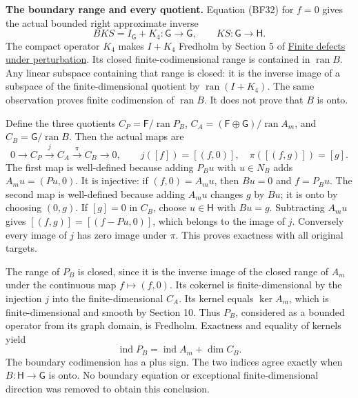 \documentclass[
  11pt,
]{article}
\begin{document}
\textbf{The boundary range and every quotient.} Equation (BF32) for
\(f=0\) gives the actual bounded right approximate inverse \[
 BK S=I_{\mathsf G}+K_4:\mathsf G\longrightarrow\mathsf G,
 \qquad KS:\mathsf G\longrightarrow\mathsf H.
 \tag{BF50}
\] The compact operator \(K_4\) makes \(I+K_4\) Fredholm by Section 5 of
\href{fredholm-stability.pdf}{Finite defects under perturbation}. Its
closed finite-codimensional range is contained in
\(\operatorname{ran}B\). Any linear subspace containing that range is
closed: it is the inverse image of a subspace of the finite-dimensional
quotient by \(\operatorname{ran}(I+K_4)\). The same observation proves
finite codimension of \(\operatorname{ran}B\). It does not prove that
\(B\) is onto.

Define the three quotients \(C_P=\mathsf F/\operatorname{ran}P_B\),
\(C_A=(\mathsf F\oplus\mathsf G)/\operatorname{ran}A_m\), and
\(C_B=\mathsf G/\operatorname{ran}B\). Then the actual maps are \[
 0\longrightarrow C_P\xrightarrow{\ j\ }C_A
 \xrightarrow{\ \pi\ }C_B\longrightarrow0,
 \qquad j([f])=[(f,0)],\quad \pi([(f,g)])=[g].
 \tag{BF51}
\] The first map is well-defined because adding \(P_Bu\) with
\(u\in N_B\) adds \(A_mu=(Pu,0)\). It is injective: if \((f,0)=A_mu\),
then \(Bu=0\) and \(f=P_Bu\). The second map is well-defined because
adding \(A_mu\) changes \(g\) by \(Bu\); it is onto by choosing
\((0,g)\). If \([g]=0\) in \(C_B\), choose \(u\in\mathsf H\) with
\(Bu=g\). Subtracting \(A_mu\) gives \([(f,g)]=[(f-Pu,0)]\), which
belongs to the image of \(j\). Conversely every image of \(j\) has zero
image under \(\pi\). This proves exactness with all original targets.

The range of \(P_B\) is closed, since it is the inverse image of the
closed range of \(A_m\) under the continuous map \(f\mapsto(f,0)\). Its
cokernel is finite-dimensional by the injection \(j\) into the
finite-dimensional \(C_A\). Its kernel equals \(\ker A_m\), which is
finite-dimensional and smooth by Section 10. Thus \(P_B\), considered as
a bounded operator from its graph domain, is Fredholm. Exactness and
equality of kernels yield \[
 \operatorname{ind}P_B
 =\operatorname{ind}A_m+\dim C_B.
 \tag{BF52}
\] The boundary codimension has a plus sign. The two indices agree
exactly when \(B:\mathsf H\to\mathsf G\) is onto. No boundary equation
or exceptional finite-dimensional direction was removed to obtain this
conclusion.
\end{document}
